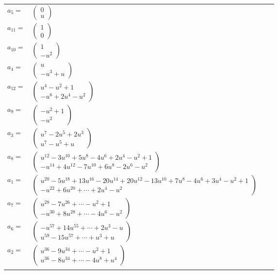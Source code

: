 \documentclass[1p]{elsarticle_modified}
\theoremstyle{definition}
\begin{document}
\begin{tabular}{m{7pt} m{180pt} m{7pt} m{180pt} }
\flushright $a_{5}=$&$\begin{pmatrix}0\\u\end{pmatrix}$ \\
\flushright $a_{11}=$&$\begin{pmatrix}1\\0\end{pmatrix}$ \\
\flushright $a_{10}=$&$\begin{pmatrix}1\\- u^2\end{pmatrix}$ \\
\flushright $a_{4}=$&$\begin{pmatrix}u\\- u^3+u\end{pmatrix}$ \\
\flushright $a_{12}=$&$\begin{pmatrix}u^4- u^2+1\\- u^6+2 u^4- u^2\end{pmatrix}$ \\
\flushright $a_{9}=$&$\begin{pmatrix}- u^2+1\\- u^2\end{pmatrix}$ \\
\flushright $a_{3}=$&$\begin{pmatrix}u^7-2 u^5+2 u^3\\u^7- u^5+u\end{pmatrix}$ \\
\flushright $a_{8}=$&$\begin{pmatrix}u^{12}-3 u^{10}+5 u^8-4 u^6+2 u^4- u^2+1\\- u^{14}+4 u^{12}-7 u^{10}+6 u^8-2 u^6- u^2\end{pmatrix}$ \\
\flushright $a_{1}=$&$\begin{pmatrix}u^{20}-5 u^{18}+13 u^{16}-20 u^{14}+20 u^{12}-13 u^{10}+7 u^8-4 u^6+3 u^4- u^2+1\\- u^{22}+6 u^{20}+\cdots+2 u^4- u^2\end{pmatrix}$ \\
\flushright $a_{7}=$&$\begin{pmatrix}u^{28}-7 u^{26}+\cdots- u^2+1\\- u^{30}+8 u^{28}+\cdots-4 u^6- u^2\end{pmatrix}$ \\
\flushright $a_{6}=$&$\begin{pmatrix}- u^{57}+14 u^{55}+\cdots+2 u^3- u\\u^{59}-15 u^{57}+\cdots+u^3+u\end{pmatrix}$ \\
\flushright $a_{2}=$&$\begin{pmatrix}u^{36}-9 u^{34}+\cdots- u^2+1\\u^{36}-8 u^{34}+\cdots-4 u^8+u^4\end{pmatrix}$\\&\end{tabular}
\end{document}
